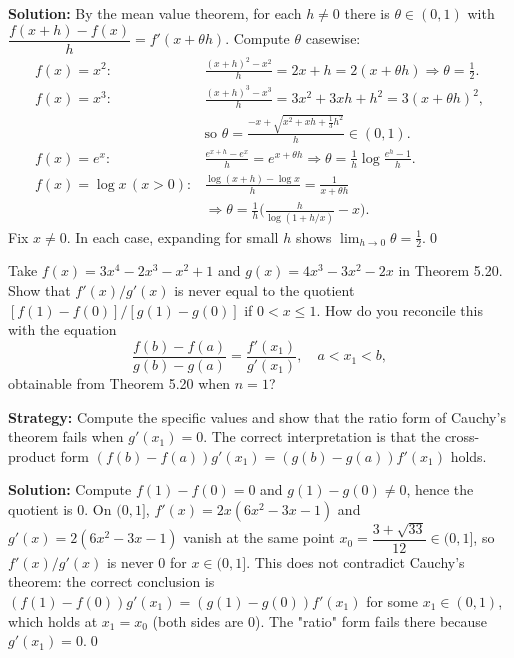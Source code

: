 \bigskip\noindent\textbf{Solution:}
By the mean value theorem, for each $h\ne 0$ there is $\theta\in(0,1)$ with $\dfrac{f(x+h)-f(x)}{h}=f'(x+\theta h)$. Compute $\theta$ casewise:
\[\begin{aligned}
f(x)=x^2:&\frac{(x+h)^2-x^2}{h}=2x+h=2(x+\theta h)\Rightarrow\theta=\tfrac12.\\
f(x)=x^3:&\frac{(x+h)^3-x^3}{h}=3x^2+3xh+h^2=3(x+\theta h)^2,\\
& \text{so }\theta=\frac{-x+\sqrt{x^2+xh+\tfrac13 h^2}}{h}\in(0,1).\\
f(x)=e^x:&\frac{e^{x+h}-e^x}{h}=e^{x+\theta h}\Rightarrow \theta=\frac1h\log\frac{e^h-1}{h}.\\
f(x)=\log x\,(x>0):&\frac{\log(x+h)-\log x}{h}=\frac{1}{x+\theta h} \\
& \Rightarrow \theta=\frac{1}{h}\Big(\frac{h}{\log(1+h/x)}-x\Big).
\end{aligned}\]
Fix $x\ne 0$. In each case, expanding for small $h$ shows $\lim_{h\to 0}\theta=\tfrac12$.\qed


\begin{problembox}
\begin{problemstatement}
Take \( f(x) = 3x^4 - 2x^3 - x^2 + 1 \) and \( g(x) = 4x^3 - 3x^2 - 2x \) in Theorem 5.20. Show that \( f'(x)/g'(x) \) is never equal to the quotient \( [f(1) - f(0)]/[g(1) - g(0)] \) if \( 0 < x \leq 1 \). How do you reconcile this with the equation
\[ \frac{f(b) - f(a)}{g(b) - g(a)} = \frac{f'(x_1)}{g'(x_1)}, \quad a < x_1 < b, \]
obtainable from Theorem 5.20 when \( n = 1 \)?
\end{problemstatement}
\end{problembox}

\noindent\textbf{Strategy:} Compute the specific values and show that the ratio form of Cauchy's theorem fails when \( g'(x_1) = 0 \). The correct interpretation is that the cross-product form \( (f(b) - f(a))g'(x_1) = (g(b) - g(a))f'(x_1) \) holds.

\bigskip\noindent\textbf{Solution:}
Compute $f(1)-f(0)=0$ and $g(1)-g(0)\ne 0$, hence the quotient is $0$. On $(0,1]$, $f'(x)=2x(6x^2-3x-1)$ and $g'(x)=2(6x^2-3x-1)$ vanish at the same point $x_0=\dfrac{3+\sqrt{33}}{12}\in(0,1]$, so $f'(x)/g'(x)$ is never $0$ for $x\in(0,1]$. This does not contradict Cauchy's theorem: the correct conclusion is $(f(1)-f(0))g'(x_1)=(g(1)-g(0))f'(x_1)$ for some $x_1\in(0,1)$, which holds at $x_1=x_0$ (both sides are $0$). The "ratio" form fails there because $g'(x_1)=0$.\qed


